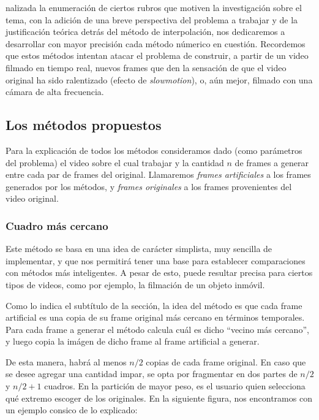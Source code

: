 \par {}nalizada la enumeraci\'on de ciertos rubros que motiven la investigaci\'on sobre el tema, con la adici\'on de una breve perspectiva del problema a trabajar y de la justificación teórica detrás del método de interpolación, nos dedicaremos a desarrollar con mayor precisi\'on cada m\'etodo n\'umerico en cuesti\'on. Recordemos que estos métodos intentan atacar el problema de construir, a partir de un video filmado en tiempo real, nuevos frames que den la sensaci\'on de que el video original ha sido ralentizado (efecto de \emph{slowmotion}), o, aún mejor, filmado con una cámara de alta frecuencia.

\subsection{Los m\'etodos propuestos}

Para la explicación de todos los métodos consideramos dado (como parámetros del problema) el video sobre el cual trabajar y la cantidad $n$ de frames a generar entre cada par de frames del original. Llamaremos \emph{frames artificiales} a los frames generados por los métodos, y \emph{frames originales} a los frames provenientes del video original.

\subsubsection{Cuadro m\'as cercano}

Este m\'etodo se basa en una idea de car\'acter simplista, muy sencilla de implementar, y que nos permitirá tener una base para establecer comparaciones con métodos más inteligentes. A pesar de esto, puede resultar precisa para ciertos tipos de videos, como por ejemplo, la filmaci\'on de un objeto inmóvil.

Como lo indica el subt\'itulo de la secci\'on, la idea del método es que cada frame artificial es una copia de su frame original más cercano en términos temporales. Para cada frame a generar el método calcula cuál es dicho ``vecino más cercano'', y luego copia la im\'agen de dicho frame al frame artificial a generar. 

De esta manera, habr\'a al menos $n/2$ copias de cada frame original. En caso que se desee agregar una cantidad impar, se opta por fragmentar en dos partes de $n/2$ y $n/2+1$ cuadros. En la partici\'on de mayor peso, es el usuario quien selecciona qu\'e extremo escoger de los originales. En la siguiente figura, nos encontramos con un ejemplo consico de lo explicado: 


